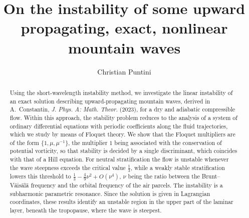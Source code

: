 \documentclass[reqno]{amsart}
\title{On the instability of some upward propagating, exact, nonlinear mountain waves}
\author[CP]{Christian Puntini}
\begin{document}


\begin{abstract}
Using the short-wavelength instability method, we investigate the linear instability of an exact solution describing upward-propagating mountain waves, derived in A.~Constantin, \emph{J. Phys. A: Math. Theor.} (2023), for a dry and adiabatic compressible flow. Within this approach, the stability problem reduces to the analysis of a system of ordinary differential equations with periodic coefficients along the fluid trajectories, which we study by means of Floquet theory. We show that the Floquet multipliers are of the form $\{1,\mu,\mu^{-1}\}$, the multiplier $1$ being associated with the conservation of potential vorticity, so that stability is decided by a single discriminant, which coincides with that of a Hill equation. For neutral stratification the flow is unstable whenever the wave steepness exceeds the critical value $\frac{1}{3}$, while a weakly stable stratification lowers this threshold to $\frac{1}{3}-\frac{4}{9}\nu^2+O(\nu^4)$, $\nu$ being the ratio between the Brunt--V\"ais\"al\"a frequency and the orbital frequency of the air parcels. The instability is a subharmonic parametric resonance. Since the solution is given in Lagrangian coordinates, these results identify an unstable region in the upper part of the laminar layer, beneath the tropopause, where the wave is steepest.
\end{abstract}

\maketitle
\end{document}
